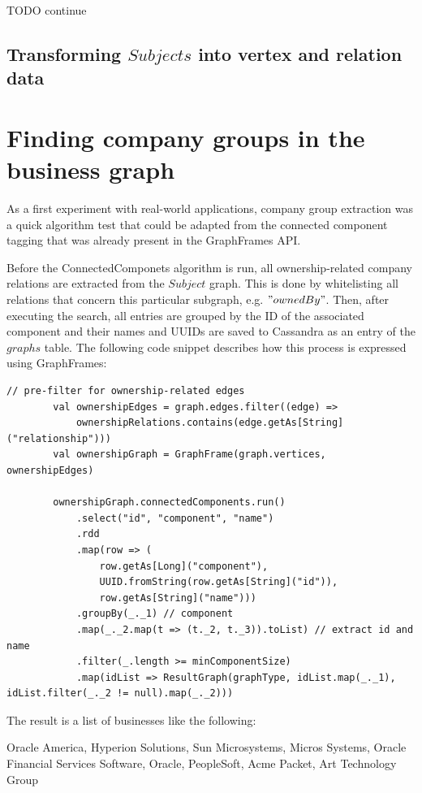 \documentclass[
        a4paper,     %
        titlepage,   %
        oneside,     %
        parskip      %
        ]{scrartcl}  %
\begin{document}
    TODO continue

    \subsection{Transforming $Subjects$ into vertex and relation data}
    \pagebreak

  \section{Finding company groups in the business graph}
  As a first experiment with real-world applications, company group extraction
  was a quick algorithm test that could be adapted from the connected component
  tagging that was already present in the GraphFrames API.

  Before the ConnectedComponets algorithm is run, all ownership-related company
  relations are extracted from the $Subject$ graph. This is done by whitelisting
  all relations that concern this particular subgraph, e.g. $"ownedBy"$.
  Then, after executing the search, all entries are grouped by the ID of the
  associated component and their names and UUIDs are saved to Cassandra
  as an entry of the $graphs$ table. The following code snippet describes how
  this process is expressed using GraphFrames:

  \begin{lstlisting}[style=scalaStyle,caption=processGraph in $CompanyGroupExtractor$]
    // pre-filter for ownership-related edges
		val ownershipEdges = graph.edges.filter((edge) =>
			ownershipRelations.contains(edge.getAs[String]("relationship")))
		val ownershipGraph = GraphFrame(graph.vertices, ownershipEdges)

		ownershipGraph.connectedComponents.run()
			.select("id", "component", "name")
			.rdd
			.map(row => (
				row.getAs[Long]("component"),
				UUID.fromString(row.getAs[String]("id")),
				row.getAs[String]("name")))
			.groupBy(_._1) // component
			.map(_._2.map(t => (t._2, t._3)).toList) // extract id and name
			.filter(_.length >= minComponentSize)
			.map(idList => ResultGraph(graphType, idList.map(_._1), idList.filter(_._2 != null).map(_._2)))
  \end{lstlisting}

  The result is a list of businesses like the following:

  Oracle America, Hyperion Solutions, Sun Microsystems, Micros Systems, Oracle Financial Services Software, Oracle, PeopleSoft, Acme Packet, Art Technology Group
\end{document}
